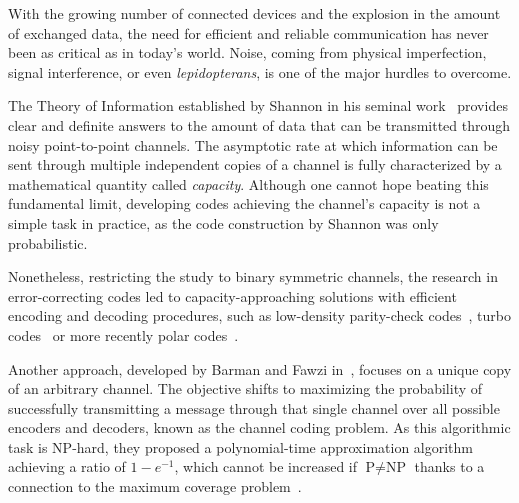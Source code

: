 
With the growing number of connected devices and the explosion in the amount of exchanged data, the need for efficient and reliable communication has never been as critical as in today's world. Noise, coming from physical imperfection, signal interference, or even \emph{lepidopterans}, is one of the major hurdles to overcome.

The Theory of Information established by Shannon in his seminal work~\cite{Shannon48} provides clear and definite answers to the amount of data that can be transmitted through noisy point-to-point channels. The asymptotic rate at which information can be sent through multiple independent copies of a channel is fully characterized by a mathematical quantity called \emph{capacity}. Although one cannot hope beating this fundamental limit, developing codes achieving the channel's capacity is not a simple task in practice, as the code construction by Shannon was only probabilistic.

Nonetheless, restricting the study to binary symmetric channels, the research in error-correcting codes led to capacity-approaching solutions with efficient encoding and decoding procedures, such as low-density parity-check codes~\cite{Gallager62}, turbo codes~\cite{BG96} or more recently polar codes~\cite{Arikan09}.

Another approach, developed by Barman and Fawzi in~\cite{BF18}, focuses on a unique copy of an arbitrary channel. The objective shifts to maximizing the probability of successfully transmitting a message through that single channel over all possible encoders and decoders, known as the channel coding problem. As this algorithmic task is \textrm{NP}-hard, they proposed a polynomial-time approximation algorithm achieving a ratio of $1-e^{-1}$, which cannot be increased if $\textrm{P}\not=\textrm{NP}$ thanks to a connection to the maximum coverage problem~\cite{Feige02}.

